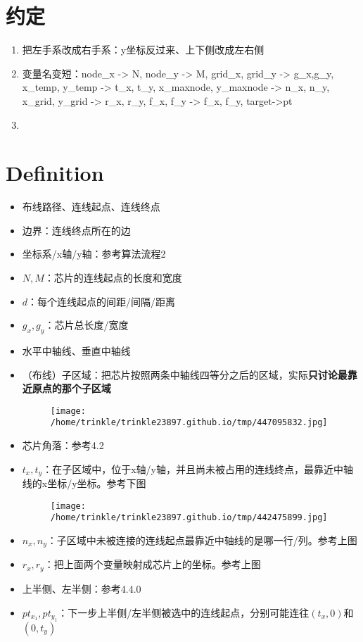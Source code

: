 \documentclass[]{article}
\date{}
\begin{document}
\section{约定}\label{header-n0}

\begin{enumerate}
\def\labelenumi{\arabic{enumi}.}
\item
  把左手系改成右手系：y坐标反过来、上下侧改成左右侧
\item
  变量名变短：node\_x -\textgreater{} N, node\_y -\textgreater{} M,
  grid\_x, grid\_y -\textgreater{} g\_x,g\_y, x\_temp, y\_temp
  -\textgreater{} t\_x, t\_y, x\_maxnode, y\_maxnode -\textgreater{}
  n\_x, n\_y, x\_grid, y\_grid -\textgreater{} r\_x, r\_y, f\_x, f\_y
  -\textgreater{} f\_x, f\_y, target-\textgreater{}pt
\item
\end{enumerate}

\section{Definition}\label{header-n12}

\begin{itemize}
\item
  布线路径、连线起点、连线终点
\item
  边界：连线终点所在的边
\item
  坐标系/x轴/y轴：参考算法流程2
\item
  \(N,M\)：芯片的连线起点的长度和宽度
\item
  \(d\)：每个连线起点的间距/间隔/距离
\item
  \(g_x,g_y\)：芯片总长度/宽度
\item
  水平中轴线、垂直中轴线
\item
  （布线）子区域：把芯片按照两条中轴线四等分之后的区域，实际\textbf{只讨论最靠近原点的那个子区域}

  \begin{figure}[htbp]
  \centering
  \texttt{[image: /home/trinkle/trinkle23897.github.io/tmp/447095832.jpg]}
  \caption{}
  \end{figure}
\item
  芯片角落：参考4.2
\item
  \(t_x,t_y\)：在子区域中，位于x轴/y轴，并且尚未被占用的连线终点，最靠近中轴线的x坐标/y坐标。参考下图

  \begin{figure}[htbp]
  \centering
  \texttt{[image: /home/trinkle/trinkle23897.github.io/tmp/442475899.jpg]}
  \caption{}
  \end{figure}
\item
  \(n_x,n_y\)：子区域中未被连接的连线起点最靠近中轴线的是哪一行/列。参考上图
\item
  \(r_x,r_y\)：把上面两个变量映射成芯片上的坐标。参考上图
\item
  上半侧、左半侧：参考4.4.0
\item
  \(pt_{x_1},pt_{y_1}\)：下一步上半侧/左半侧被选中的连线起点，分别可能连往\((t_x,0)\)和\((0,t_y)\)
\end{itemize}
\end{document}
